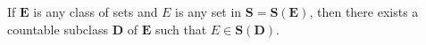 If $\mathbf{E}$ is any class of sets and $E$ is any set in $\mathbf{S} = \mathbf{S}(\mathbf{E})$, then there exists a countable subclass $\mathbf{D}$ of $\mathbf{E}$ such that $E \in \mathbf{S}(\mathbf{D})$.
